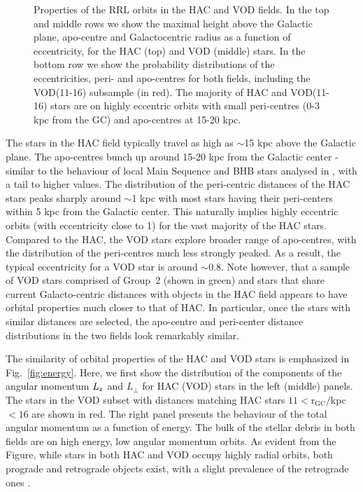 \documentclass[a4paper,useAMS,usenatbib]{mnras}
\begin{document}
\begin{figure}
\vspace{-0.45cm}
  \caption{Properties of the RRL orbits in the HAC and VOD
    fields. In the top and middle rows we show the maximal height
    above the Galactic plane, apo-centre and Galactocentric radius as a
    function of eccentricity, for the HAC (top) and VOD (middle)
    stars. In the bottom row we show the probability distributions of
    the eccentricities, peri- and apo-centres for both fields,
    including the VOD(11-16) subsample (in red). The majority of HAC
    and VOD(11-16) stars are on highly eccentric orbits with small
    peri-centres (0-3 kpc from the GC) and apo-centres at 15-20 kpc.}
    \label{fig:orbits}   
    \end{figure}
%

The stars in the HAC field typically travel as high as $\sim$15 kpc
above the Galactic plane. The apo-centres bunch up around 15-20 kpc
from the Galactic center - similar to the behaviour of local Main
Sequence and BHB stars analysed in \citet{Deason2018pileup}, with a
tail to higher values. The distribution of the peri-centric distances
of the HAC stars peaks sharply around $\sim$1 kpc with most stars
having their peri-centers within 5 kpc from the Galactic center. This
naturally implies highly eccentric orbits (with eccentricity close to
1) for the vast majority of the HAC stars. Compared to the HAC, the
VOD stars explore broader range of apo-centres, with the distribution
of the peri-centres much less strongly peaked. As a result, the
typical eccentricity for a VOD star is around $\sim$0.8. Note however,
that a sample of VOD stars comprised of Group~2 (shown in green) and
stars that share current Galacto-centric distances with objects
in the HAC field appears to have orbital properties much closer to
that of HAC. In particular, once the stars with similar distances are
selected, the apo-centre and peri-center distance distributions in the
two fields look remarkably similar.

The similarity of orbital properties of the HAC and VOD stars is
emphasized in Fig.~\ref{fig:energy}. Here, we first show the
distribution of the components of the angular momentum $L_{\rm z}$ and
$L_{\perp}$ for HAC (VOD) stars in the left (middle) panels. The stars in the 
VOD subset with distances matching HAC stars $11\mathrm{<r_{GC}}/$kpc$<16$ are shown in red. The
right panel presents the behaviour of the total angular momentum as a
function of energy. The bulk of the stellar debris in both fields are
on high energy, low angular momentum orbits. As evident from the
Figure, while stars in both HAC and VOD occupy highly radial orbits,
both prograde and retrograde objects exist, with a slight prevalence
of the retrograde ones \citep[see
  also][]{actionhalo,shards,Helmi2018}.
\end{document}
